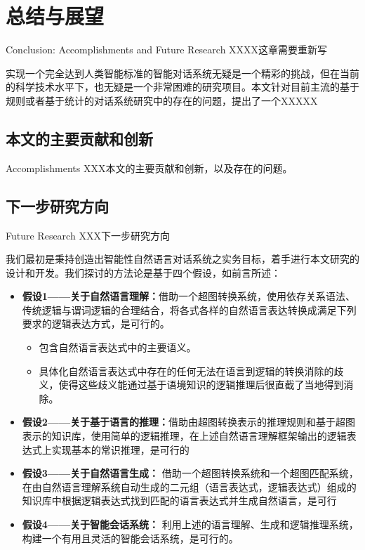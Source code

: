 \chapter{总结与展望}{Conclusion: Accomplishments and Future Research}
\label{chap:conclusion}
XXXX这章需要重新写

实现一个完全达到人类智能标准的智能对话系统无疑是一个精彩的挑战，但在当前的科学技术水平下，也无疑是一个非常困难的研究项目。本文针对目前主流的基于规则或者基于统计的对话系统研究中的存在的问题，提出了一个XXXXX

\section{本文的主要贡献和创新}{Accomplishments}
XXX本文的主要贡献和创新，以及存在的问题。

\section{下一步研究方向}{Future Research}
XXX下一步研究方向

我们最初是秉持创造出智能性自然语言对话系统之实务目标，着手进行本文研究的设计和开发。我们探讨的方法论是基于四个假设，如前言所述：

\begin{itemize}
\item {\bf 假设1——关于自然语言理解：}借助一个超图转换系统，使用依存关系语法、传统逻辑与谓词逻辑的合理结合，将各式各样的自然语言表达转换成满足下列要求的逻辑表达方式，是可行的。
    \begin{itemize}
    \item 包含自然语言表达式中的主要语义。
    \item 具体化自然语言表达式中存在的任何无法在语言到逻辑的转换消除的歧义，使得这些歧义能通过基于语境知识的逻辑推理后很直截了当地得到消除。
    \end{itemize}
\item {\bf 假设2——关于基于语言的推理：}借助由超图转换表示的推理规则和基于超图表示的知识库，使用简单的逻辑推理，在上述自然语言理解框架输出的逻辑表达式上实现基本的常识推理，是可行的
\item {\bf 假设3——关于自然语言生成：} 借助一个超图转换系统和一个超图匹配系统，在由自然语言理解系统自动生成的二元组（语言表达式，逻辑表达式）组成的知识库中根据逻辑表达式找到匹配的语言表达式并生成自然语言，是可行
\item  {\bf 假设4——关于智能会话系统：} 利用上述的语言理解、生成和逻辑推理系统，构建一个有用且灵活的智能会话系统，是可行的。
\end{itemize}


